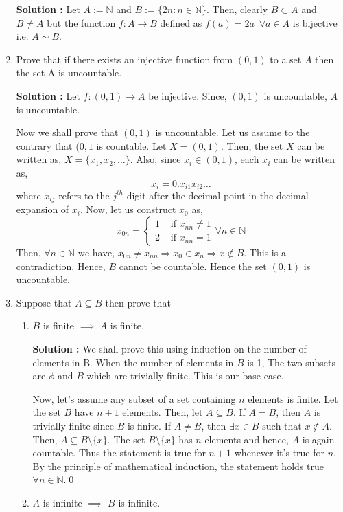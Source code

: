 \documentclass[10pt]{article}
\newcommand{\nn}{\mathbb{N}}
\begin{document}
\begin{enumerate}
    \textbf{Solution : }Let $A := \nn$ and $B := \{2n : n \in \nn \}$. Then, clearly $B \subset A$ and $B \neq A$ but the function $f : A \to B$ defined as $f(a) = 2a \,\,\, \forall a \in A$ is bijective i.e. $A \sim B$.
    \item Prove that if there exists an injective function from $(0, 1)$ to a set $A$ then the set A is uncountable.

	    \textbf{Solution :} Let $f : (0, 1) \to A$ be injective. Since, $(0, 1)$ is uncountable,
	    $A$ is uncountable.

	    Now we shall prove that $(0, 1)$ is uncountable. Let us assume to the contrary that $(0, 1$ is countable.
	    Let $X = (0, 1)$. Then, the set $X$ can be written as, $X = \{ x_1, x_2, \dots \}$. Also, since $x_i \in (0, 1)$, each $x_i$ can be written as,
	    $$x_i = 0.x_{i1}x_{i2} \dots $$ where $x_{ij}$ refers to the $j^{th}$ digit after the decimal point in the decimal
	    expansion of $x_i$.
	    Now, let us construct $x_0$ as,
	    \begin{equation*}
		    x_{0n} = 
		    \begin{cases}
			    1 & \text{ if } x_{nn} \neq 1 \\
			    2 & \text{ if } x_{nn} = 1
		    \end{cases}
		    \forall n \in \nn
	    \end{equation*}
	    Then, $\forall n \in \nn \text{ we have, } x_{0n} \neq x_{nn} \Rightarrow x_0 \in x_n \Rightarrow x \notin B$. This is a contradiction. Hence, $B$ cannot be countable.
	    Hence the set $(0, 1)$ is uncountable.


    \item Suppose that $A \subseteq B$ then prove that 
    \begin{enumerate}
        \item $B$ is finite $\implies$ $A$ is finite.

		\textbf{Solution : }We shall prove this using induction on the number of elements in B.
		When the number of elements in $B$ is 1, The two subsets are $\phi$ and $B$ which are trivially finite. This is our base case. 
		
		Now, let's assume any subset of a set containing $n$ elements is finite. Let the set $B$ have $n + 1$ elements.
		Then, let $A \subseteq B$. If $A = B$, then $A$ is trivially finite since $B$ is finite. If $A \neq B$, then 
		$\exists x \in B \text{ such that } x \notin A$. Then, $A \subseteq B\setminus\{x\}$. The set $B\setminus \{x\}$ has 
		$n$ elements and hence, $A$ is again countable. Thus the statement is true for $n + 1$ whenever it's true for $n$. By the principle of
		mathematical induction, the statement holds true $\forall n \in \nn$.\qed
        \item $A$ is infinite $\implies$ $B$ is infinite.


\end{enumerate}
\end{enumerate}
\end{document}
